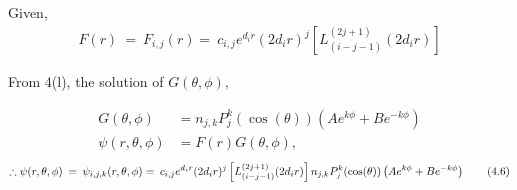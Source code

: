 \documentclass{article}
\begin{document}
\vspace{2cm}
\subsection{}%

\large{
Given,
\begin{align*}
    F(r) \: = \: F_{i,j}(r) = \: c_{i,j} e^{d_i r} (2d_i r)^j \left[ L^{(2j+1)}_{(i-j-1)} (2d_i r) \right] \tag{23}
\end{align*}

From 4(l), the solution of $G(\theta, \phi)$,

\begin{align*}
    G(\theta, \phi)		& = n_{j,k} P^k_j (\cos (\theta)) \left( A e^{k\phi} + B e^{-k\phi} \right)\tag{4.5}\\
    \psi(r, \theta, \phi)	& = F(r) G(\theta, \phi),\tag{15}
\end{align*}
\begin{equation*}
    \therefore \psi(r, \theta, \phi) \: = \: \psi_{i, j, k}(r, \theta, \phi) = \: c_{i,j} e^{d_i r} (2d_i r)^j \left[ L^{(2j+1)}_{(i-j-1)} (2d_i r) \right] \\
    n_{j,k} P^k_j (\cos (\theta)) \left( A e^{k\phi} + B e^{-k\phi} \right)\tag{4.6}
\end{equation*}

}

\newpage
\end{document}
